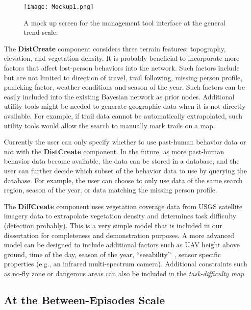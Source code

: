 \begin{figure}
\centering
\texttt{[image: Mockup1.png]}
\caption{A mock up screen for the management tool interface at the general trend scale.}
\label{Mockup1}
\end{figure}

The \textbf{DistCreate} component considers three terrain features: topography, elevation, and vegetation density. It is probably beneficial to incorporate more factors that affect lost-person behaviors into the network. Such factors include but are not limited to direction of travel, trail following, missing person profile, panicking factor, weather conditions and season of the year. Such factors can be easily included into the existing Bayesian network as prior nodes. Additional utility tools might be needed to generate geographic data when it is not directly available. For example, if trail data cannot be automatically extrapolated, such utility tools would allow the search to manually mark trails on a map.

Currently the user can only specify whether to use past-human behavior data or not with the \textbf{DistCreate} component. In the future, as more past-human behavior data become available, the data can be stored in a database, and the user can further decide which subset of the behavior data to use by querying the database. For example, the user can choose to only use data of the same search region, season of the year, or data matching the missing person profile.

The \textbf{DiffCreate} component uses vegetation coverage data from USGS satellite imagery data to extrapolate vegetation density and determines task difficulty (detection probably). This is a very simple model that is included in our dissertation for completeness and demonstration purposes. A more advanced model can be designed to include additional factors such as UAV height above ground, time of the day, season of the year, ``seeability''~\cite{Morse2010UAV}, sensor specific properties (e.g., an infrared multi-spectrum camera). Additional constraints such as no-fly zone or dangerous areas can also be included in the \textit{task-difficulty map}.

\subsection{At the Between-Episodes Scale}


